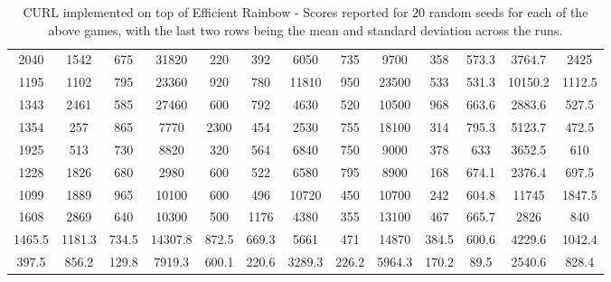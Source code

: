\begin{table}[!ht]
\begin{tabular}{c|c|c|c|c|c|c|c|c|c|c|c|c}
2040 &	1542 &	675 &	31820 &	220 &	392 &	6050 &	735 &	9700 &	358 &	573.3 &	3764.7 &	2425  \\
1195 &	1102 &	795 &	23360 &	920 &	780 &	11810 &	950 &	23500 &	533 &	531.3 &	10150.2 &	1112.5  \\
1343 &	2461 &	585	 & 27460 & 600 &	792 &	4630 &	520 &	10500 &	968 &	663.6 &	2883.6 &	527.5  \\
1354 &	257 &	865 &	7770 &	2300 &	454 &	2530 &	755 &	18100 &	314 &	795.3 &	5123.7	 & 472.5  \\
1925 &	513 &	730 &	8820 &	320 &	564 &	6840 &	750 &	9000 &	378 &	633 &	3652.5 &	610  \\
1228 &	1826 &	680 &	2980 &	600 &	522 &	6580 &	795 &	8900 &	168 &	674.1 &	2376.4 &	697.5  \\
1099 &	1889 &	965 &	10100 &	600 &	496 &	10720 &	450 &	10700 &	242 &	604.8 &	11745 &	1847.5 \\
1608 &	2869	 & 640 &	10300  & 500 &	1176 &	4380 &	355 &	13100 &	467 &	665.7 &	2826 &	840  \\
\hline
1465.5 &	1181.3 &	734.5 &	14307.8 &	872.5 &	669.3 &	5661 &	471 &	14870 &	384.5 &	600.6 &	4229.6 &	1042.4  \\ 
\hline
397.5 &	856.2 &	129.8 &	7919.3 &	600.1 &	220.6 &	3289.3 &	226.2 &	5964.3 &	170.2  & 89.5 &	2540.6 & 828.4 \\
\hline
\end{tabular}
\vspace*{-0mm}
\caption{CURL implemented on top of Efficient Rainbow - Scores reported for $20$ random seeds for each of the above games, with the last two rows being the mean and standard deviation across the runs.}
\label{tab:atari1}
\vspace{-2mm}
\end{table}


